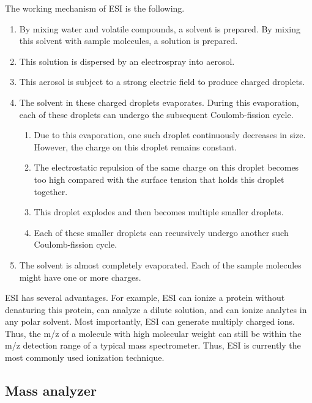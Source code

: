 The working mechanism of \gls{ESI} is the following.
\begin{enumerate}[nolistsep]
\item By mixing water and volatile compounds, a solvent is prepared. 
	By mixing this solvent with sample molecules, a solution is prepared.
\item This solution is dispersed by an electrospray into aerosol.
\item This aerosol is subject to a strong electric field to produce charged droplets.
\item The solvent in these charged droplets evaporates. 
	During this evaporation, each of these droplets can undergo the subsequent Coulomb-fission cycle.
	\begin{enumerate}[nolistsep,label={\arabic*.}]
	\item Due to this evaporation, one such droplet continuously decreases in size. 
		However, the charge on this droplet remains constant.
	\item The electrostatic repulsion of the same charge on this droplet becomes too high compared with the surface tension that holds this droplet together. 
	\item This droplet explodes and then becomes multiple smaller droplets. 
	\item Each of these smaller droplets can recursively undergo another such Coulomb-fission cycle.
	\end{enumerate}
\item 
	The solvent is almost completely evaporated.
	Each of the sample molecules might have one or more charges. %
\end{enumerate}
\Gls{ESI} has several advantages. 
For example, \gls{ESI} can ionize a protein without denaturing this protein, can analyze a dilute solution, and can ionize analytes in any polar solvent. 
Most importantly, \gls{ESI} can generate multiply charged ions. 
Thus, the \gls{m/z} of a molecule with high molecular weight can still be within the \gls{m/z} detection range of a typical mass spectrometer.
Thus, \gls{ESI} is currently the most commonly used ionization technique. 

\subsection{Mass analyzer} 
\label{subsec:MS:MS:analyzer}

